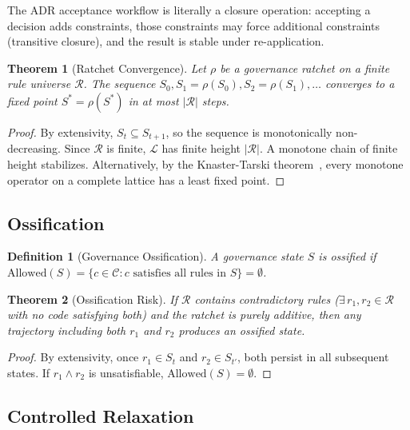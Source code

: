 \documentclass[11pt, a4paper, copyright]{googledeepmind}
\newtheorem{definition}{Definition}[section]
\newtheorem{theorem}{Theorem}[section]
\begin{document}
The ADR acceptance workflow is literally a closure operation: accepting a decision adds constraints, those constraints may force additional constraints (transitive closure), and the result is stable under re-application.

\begin{theorem}[Ratchet Convergence]
\label{thm:ratchet}
Let $\rho$ be a governance ratchet on a finite rule universe $\mathcal{R}$. The sequence $S_0, S_1 = \rho(S_0), S_2 = \rho(S_1), \ldots$ converges to a fixed point $S^* = \rho(S^*)$ in at most $|\mathcal{R}|$ steps.
\end{theorem}

\begin{proof}
By extensivity, $S_t \subseteq S_{t+1}$, so the sequence is monotonically non-decreasing. Since $\mathcal{R}$ is finite, $\mathcal{L}$ has finite height $|\mathcal{R}|$. A monotone chain of finite height stabilizes. Alternatively, by the Knaster-Tarski theorem~\citep{tarski1955}, every monotone operator on a complete lattice has a least fixed point.
\end{proof}

\subsection{Ossification}

\begin{definition}[Governance Ossification]
A governance state $S$ is \emph{ossified} if $\mathrm{Allowed}(S) = \{c \in \mathcal{C} : c \text{ satisfies all rules in } S\} = \emptyset$.
\end{definition}

\begin{theorem}[Ossification Risk]
\label{thm:ossification}
If $\mathcal{R}$ contains contradictory rules ($\exists\, r_1, r_2 \in \mathcal{R}$ with no code satisfying both) and the ratchet is purely additive, then any trajectory including both $r_1$ and $r_2$ produces an ossified state.
\end{theorem}

\begin{proof}
By extensivity, once $r_1 \in S_t$ and $r_2 \in S_{t'}$, both persist in all subsequent states. If $r_1 \wedge r_2$ is unsatisfiable, $\mathrm{Allowed}(S) = \emptyset$.
\end{proof}

\subsection{Controlled Relaxation}
\end{document}
